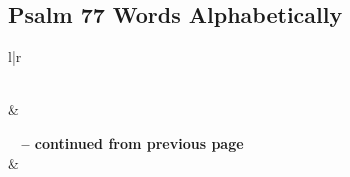 

\subsection{Psalm 77 Words Alphabetically}


\normalsize
 
\begin{center}
\begin{longtable}{l|r}
\caption[Psalm 77 Words Alphabetically]{Psalm 77 Words Alphabetically}\label{table:WordsAlphabetically for Psalm 77} \\
\hline {} &  \\ \hline 
\endfirsthead
 
{{\bfseries \tablename\ \thetable{} -- continued from previous page}} \\  
\hline {} &  \\ \hline 
\endhead
 

\end{longtable}
\end{center}
